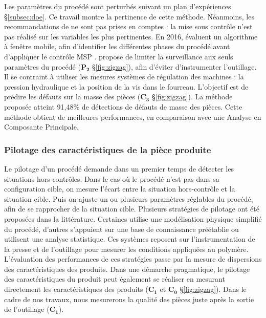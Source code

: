 Les paramètres du procédé sont perturbés suivant un plan d'expériences §\ref{subsec:doe}.
Ce travail montre la pertinence de cette méthode.
Néanmoins, les recommandations de \citeauthor{pillet_maitrise_2003} \cite{pillet_maitrise_2003} ne sont pas prises en comptes : la mise sous contrôle n'est pas réalisé sur les variables les plus pertinentes.
En 2016, \citeauthor{liu_window-based_2016} évaluent un algorithme à fenêtre mobile, afin d’identifier les différentes phases du procédé avant d’appliquer le contrôle MSP \cite{liu_window-based_2016}.
\citeauthor{zhang_statistical_2016} \cite{zhang_statistical_2016} propose de limiter la surveillance aux seuls paramètres du procédé ($\boldsymbol{P_2}$ §\ref{fig:zigzag}), afin d'éviter d'instrumenter l'outillage.
Il se contraint à utiliser les mesures systèmes de régulation des machines : la pression hydraulique et la position de la vis dans le fourreau.
L’objectif est de prédire les défauts sur la masse des pièces ($\boldsymbol{C_3}$ §\ref{fig:zigzag}).
La méthode proposée atteint 91,48\% de détections de défauts de masse des pièces.
Cette méthode obtient de meilleures performances, en comparaison avec une Analyse en Composante Principale.

\subsubsection{Pilotage des caractéristiques de la pièce produite}
Le pilotage d’un procédé demande dans un premier temps de détecter les situations hors-contrôles.
Dans le cas où le procédé n'est pas dans sa configuration cible, on mesure l’écart entre la situation hors-contrôle et la situation cible.
Puis on ajuste un ou plusieurs paramètres réglables du procédé, afin de se rapprocher de la situation cible.
Plusieurs stratégies de pilotage ont été proposées dans la littérature.
Certaines utilise une modélisation physique simplifié du procédé, d'autres s'appuient sur une base de connaissance préétablie ou utilisent une analyse statistique.
Ces systèmes reposent sur l’instrumentation de la presse et de l'outillage pour mesurer les conditions appliquées au polymère.
L'évaluation des performances de ces stratégies passe par la mesure de dispersions des caractéristiques des produits.
Dans une démarche pragmatique, le pilotage des caractéristiques du produit peut également se réaliser en mesurant directement les caractéristiques des produits ($\boldsymbol{C_1}$ et $\boldsymbol{C_0}$ §\ref{fig:zigzag}).
Dans le cadre de nos travaux, nous mesurerons la qualité des pièces juste après la sortie de l'outillage ($\boldsymbol{C_1}$).

